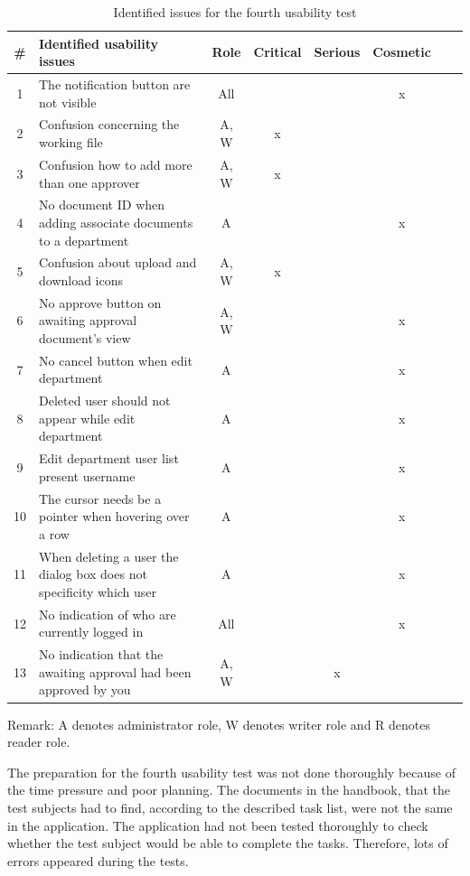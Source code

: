 \documentclass[../../master.tex]{subfiles}
\begin{document}
\begin{table}[H]
	\begin{center}
	\begin{tabular}{| c | m{15em} | c | c | c | c | c | c |}
		\hline
		\# & \textbf{Identified usability issues} & Role & Critical & Serious & Cosmetic \\
		\hline
		 1 & The notification button are not visible & All & & & x \\
		\hline
		 2 & Confusion concerning the working file & A, W & x & & \\
		\hline
		 3 & Confusion how to add more than one approver & A, W & x & & \\
		\hline
		4 & No document ID when adding associate documents to a department & A & & & x\\
		\hline
		5 &  Confusion about upload and download icons & A, W & x &  &\\
		\hline
		6 & No approve button on awaiting approval document's view & A, W &  & & x\\
		\hline
		7 & No cancel button when edit department & A & & & x\\
		\hline
		8 & Deleted user should not appear while edit department & A & & & x \\
		\hline
		9 & Edit department user list present username & A &  & & x \\
		\hline
		10 & The cursor needs be a pointer when hovering over a row & A &  &  & x \\
		\hline
		11 & When deleting a user the dialog box  does not specificity which user & A & & & x\\
		\hline
		12 & No indication of who are currently logged in & All & & & x \\
		\hline
		13 & No indication that the awaiting approval had been approved by you & A, W & & x & \\
		\hline
	\end{tabular}
	\end{center}
	 {\raggedright Remark: A denotes administrator role, W denotes writer role and R denotes reader role.\par}
	\caption{Identified issues for the fourth usability test}\label{tab:utest4}
\end{table}

The preparation for the fourth usability test was not done thoroughly because of the time pressure and poor planning.
The documents in the handbook, that the test subjects had to find, according to the described task list, were not the same in the application.
The application had not been tested thoroughly to check whether the test subject would be able to complete the tasks.
Therefore, lots of errors appeared during the tests.
\end{document}

